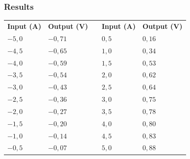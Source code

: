 \subsubsection{Results}

\begin{table}[H]
\begin{tabular}{|l|l|l| l|l|}
\cline{1-2}\cline{4-5}%
  \textbf{Input (A)}   & \textbf{Output (V)} &\phantom{hey}& \textbf{Input (A)}   & \textbf{Output (V)}\\
\cline{1-2}\cline{4-5}%
  $-5,0$               &            $-0,71$  &             & $0,5$                & $0,16$             \\
\cline{1-2}\cline{4-5}%
  $-4,5$               &            $-0,65$  &             & $1,0$                & $0,34$             \\
\cline{1-2}\cline{4-5}%
  $-4,0$               &            $-0,59$  &             & $1,5$                & $0,53$             \\
\cline{1-2}\cline{4-5}%
  $-3,5$               &            $-0,54$  &             & $2,0$                & $0,62$             \\
\cline{1-2}\cline{4-5}%
  $-3,0$               &            $-0,43$  &             & $2,5$                & $0,64$             \\
\cline{1-2}\cline{4-5}%
  $-2,5$               &            $-0,36$  &             & $3,0$                & $0,75$             \\
\cline{1-2}\cline{4-5}%
  $-2,0$               &            $-0,27$  &             & $3,5$                & $0,78$             \\
\cline{1-2}\cline{4-5}%
  $-1,5$               &            $-0,20$  &             & $4,0$                & $0,80$             \\
\cline{1-2}\cline{4-5}%
  $-1,0$               &            $-0,14$  &             & $4,5$                & $0,83$             \\
\cline{1-2}\cline{4-5}%
  $-0,5$               &            $-0,07$  &             & $5,0$                & $0,88$             \\
\cline{1-2}\cline{4-5}%
\end{tabular}
\end{table}

